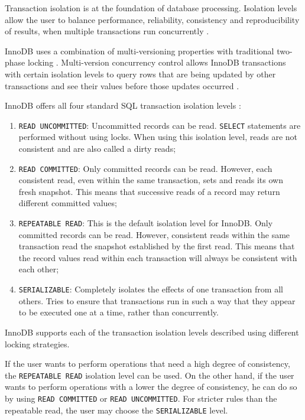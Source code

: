 \documentclass[12pt]{article}
\newcounter{subsubsubsection}[subsubsection]
\begin{document}
Transaction isolation is at the foundation of database processing. Isolation levels allow the user to balance performance, reliability, consistency and reproducibility of results, when multiple transactions run concurrently \parencite{transactionIsolationLevels}.

InnoDB uses a combination of multi-versioning properties with traditional two-phase locking \parencite{innodbTransactionModel}. Multi-version concurrency control allows InnoDB transactions with certain isolation levels to query rows that are being updated by other transactions and see their values before those updates occurred \parencite{MVCC}.


\label{isolationLevels} 
InnoDB offers all four standard SQL transaction isolation levels \parencite{transactionIsolationLevels}:
\begin{enumerate}
    \item \verb|READ UNCOMMITTED|: Uncommitted records can be read. \verb|SELECT| statements are performed without using locks. When using this isolation level, reads are not consistent and are also called a dirty reads;
    
    \item \verb|READ COMMITTED|: Only committed records can be read. However, each consistent read, even within the same transaction, sets and reads its own fresh snapshot. This means that successive reads of a record may return different committed values;
    
    \item \verb|REPEATABLE READ|: This is the default isolation level for InnoDB. Only committed records can be read. However, consistent reads within the same transaction read the snapshot established by the first read. This means that the record values read within each transaction will always be consistent with each other;
    
    \item \verb|SERIALIZABLE|: Completely isolates the effects of one transaction from all others. Tries to ensure that transactions run in such a way that they appear to be executed one at a time, rather than concurrently.
\end{enumerate}

\vspace{0.3cm}

InnoDB supports each of the transaction isolation levels described using different locking strategies. 

If the user wants to perform operations that need a high degree of consistency, the \verb|REPEATABLE READ| isolation level can be used. On the other hand, if the user wants to perform operations with a lower the degree of consistency, he can do so by using \verb|READ COMMITTED| or \verb|READ UNCOMMITTED|. For stricter rules than the repeatable read, the user may choose the \verb|SERIALIZABLE| level.
\end{document}

